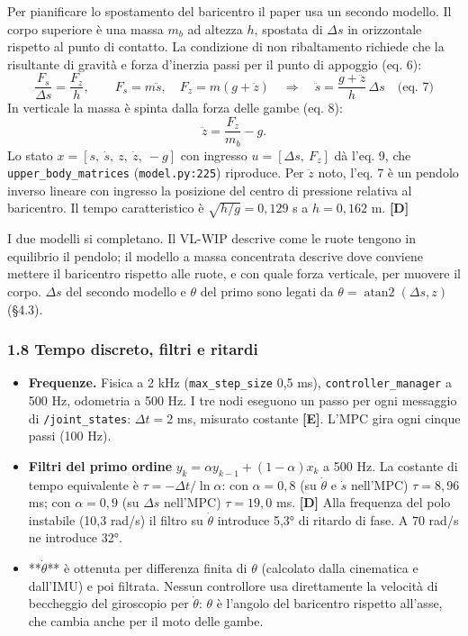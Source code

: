 \documentclass[
]{article}
\providecommand{\tightlist}{%
  \setlength{\itemsep}{0pt}\setlength{\parskip}{0pt}}
\begin{document}
Per pianificare lo spostamento del baricentro il paper usa un secondo modello. Il corpo superiore è una massa \(m_b\) ad altezza \(h\), spostata di \(\Delta s\) in orizzontale rispetto al punto di contatto. La condizione di non ribaltamento richiede che la risultante di gravità e forza d'inerzia passi per il punto di appoggio (eq. 6): \[\frac{F_s}{\Delta s} = \frac{F_z}{h},\qquad F_s = m\ddot s,\quad F_z = m(g+\ddot z)\quad\Longrightarrow\quad \ddot s = \frac{g+\ddot z}{h}\,\Delta s \quad\text{(eq. 7)}\] In verticale la massa è spinta dalla forza delle gambe (eq. 8): \[\ddot z = \frac{F_z}{m_b} - g .\] Lo stato \(x = [s,\ \dot s,\ z,\ \dot z,\ -g]\) con ingresso \(u = [\Delta s,\ F_z]\) dà l'eq. 9, che \texttt{upper\_body\_matrices} (\texttt{model.py:225}) riproduce. Per \(\ddot z\) noto, l'eq. 7 è un pendolo inverso lineare con ingresso la posizione del centro di pressione relativa al baricentro. Il tempo caratteristico è \(\sqrt{h/g} = 0{,}129\) s a \(h = 0{,}162\) m. \textbf{[D]}

I due modelli si completano. Il VL-WIP descrive come le ruote tengono in equilibrio il pendolo; il modello a massa concentrata descrive dove conviene mettere il baricentro rispetto alle ruote, e con quale forza verticale, per muovere il corpo. \(\Delta s\) del secondo modello e \(\theta\) del primo sono legati da \(\theta = \operatorname{atan2}(\Delta s, z)\) (§4.3).

\subsubsection{1.8 Tempo discreto, filtri e ritardi}\label{18-tempo-discreto-filtri-e-ritardi}

\begin{itemize}
\tightlist
\item \textbf{Frequenze.} Fisica a 2 kHz (\texttt{max\_step\_size} 0,5 ms), \texttt{controller\_manager} a 500 Hz, odometria a 500 Hz. I tre nodi eseguono un passo per ogni messaggio di \texttt{/joint\_states}: \(\Delta t = 2\) ms, misurato costante \textbf{[E]}. L'MPC gira ogni cinque passi (100 Hz).
\item \textbf{Filtri del primo ordine} \(y_k = \alpha y_{k-1} + (1-\alpha)x_k\) a 500 Hz. La costante di tempo equivalente è \(\tau = -\Delta t/\ln\alpha\): con \(\alpha = 0{,}8\) (su \(\dot\theta\) e \(\dot s\) nell'MPC) \(\tau = 8{,}96\) ms; con \(\alpha = 0{,}9\) (su \(\Delta s\) nell'MPC) \(\tau = 19{,}0\) ms. \textbf{[D]} Alla frequenza del polo instabile (10,3 rad/s) il filtro su \(\dot\theta\) introduce 5,3° di ritardo di fase. A 70 rad/s ne introduce 32°.
\item **\(\dot\theta\)** è ottenuta per differenza finita di \(\theta\) (calcolato dalla cinematica e dall'IMU) e poi filtrata. Nessun controllore usa direttamente la velocità di beccheggio del giroscopio per \(\dot\theta\): \(\theta\) è l'angolo del baricentro rispetto all'asse, che cambia anche per il moto delle gambe.
\end{itemize}
\end{document}
